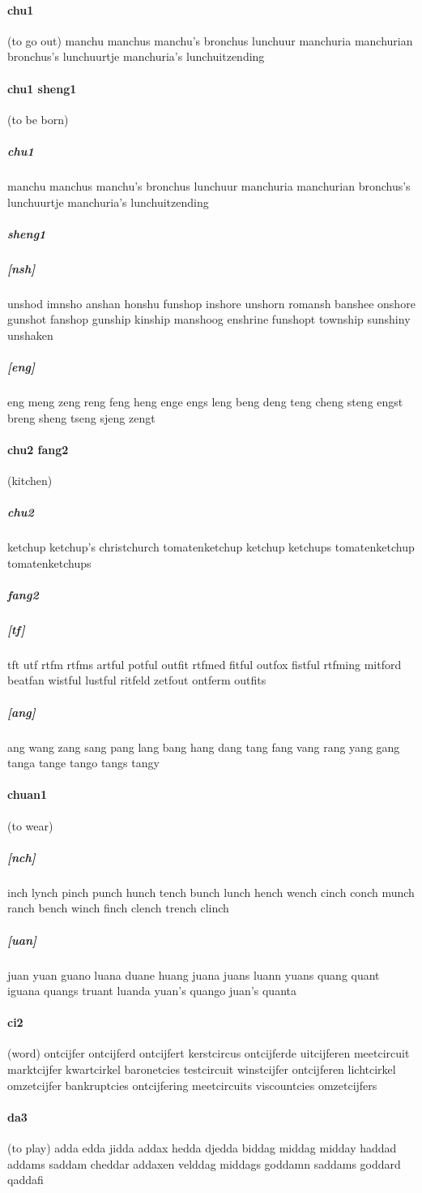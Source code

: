 \documentclass{article}
\begin{document}
\paragraph{chu1}(to go out) manchu
manchus
manchu's
bronchus
lunchuur
manchuria
manchurian
bronchus's
lunchuurtje
manchuria's
lunchuitzending
\paragraph{chu1 sheng1}(to be born) \subparagraph{chu1}manchu
manchus
manchu's
bronchus
lunchuur
manchuria
manchurian
bronchus's
lunchuurtje
manchuria's
lunchuitzending
\subparagraph{sheng1}\subparagraph{[nsh]}unshod
imnsho
anshan
honshu
funshop
inshore
unshorn
romansh
banshee
onshore
gunshot
fanshop
gunship
kinship
manshoog
enshrine
funshopt
township
sunshiny
unshaken
\subparagraph{[eng]}eng
meng
zeng
reng
feng
heng
enge
engs
leng
beng
deng
teng
cheng
steng
engst
breng
sheng
tseng
sjeng
zengt
\paragraph{chu2 fang2}(kitchen) \subparagraph{chu2}ketchup
ketchup's
christchurch
tomatenketchup
ketchup ketchups
tomatenketchup tomatenketchups
\subparagraph{fang2}\subparagraph{[tf]}tft
utf
rtfm
rtfms
artful
potful
outfit
rtfmed
fitful
outfox
fistful
rtfming
mitford
beatfan
wistful
lustful
ritfeld
zetfout
ontferm
outfits
\subparagraph{[ang]}ang
wang
zang
sang
pang
lang
bang
hang
dang
tang
fang
vang
rang
yang
gang
tanga
tange
tango
tangs
tangy
\paragraph{chuan1}(to wear) \subparagraph{[nch]}inch
lynch
pinch
punch
hunch
tench
bunch
lunch
hench
wench
cinch
conch
munch
ranch
bench
winch
finch
clench
trench
clinch
\subparagraph{[uan]}juan
yuan
guano
luana
duane
huang
juana
juans
luann
yuans
quang
quant
iguana
quangs
truant
luanda
yuan's
quango
juan's
quanta
\paragraph{ci2}(word) ontcijfer
ontcijferd
ontcijfert
kerstcircus
ontcijferde
uitcijferen
meetcircuit
marktcijfer
kwartcirkel
baronetcies
testcircuit
winstcijfer
ontcijferen
lichtcirkel
omzetcijfer
bankruptcies
ontcijfering
meetcircuits
viscountcies
omzetcijfers
\paragraph{da3}(to play) adda
edda
jidda
addax
hedda
djedda
biddag
middag
midday
haddad
addams
saddam
cheddar
addaxen
velddag
middags
goddamn
saddams
goddard
qaddafi
\end{document}
